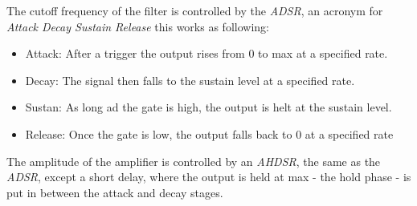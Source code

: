 The cutoff frequency of the filter is controlled by the \emph{ADSR}, an acronym
for \emph{Attack Decay Sustain Release} this works as following:
\begin{itemize}
  \item Attack: After a trigger the output rises from 0
to max at a specified rate.
  \item Decay: The signal then falls to the sustain level at a specified rate.
  \item Sustan: As long ad the gate is high, the output is helt at the sustain
  level.
  \item Release: Once the gate is low, the output falls back to 0 at a specified
  rate
\end{itemize}

The amplitude of the amplifier is controlled by an \emph{AHDSR}, the same as the
\emph{ADSR}, except a short delay, where the output is held at max - the hold
phase - is put in between the attack and decay stages.
 